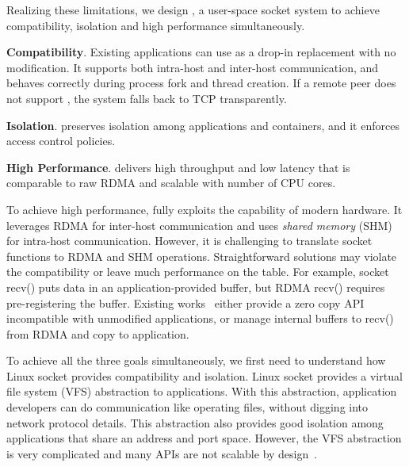 
Realizing these limitations, we design \sys{}, a user-space socket system to achieve compatibility, isolation and high performance simultaneously.
\begin{ecompact}
	\item \textbf{Compatibility}.
	Existing applications can use \sys{} as a drop-in replacement with no modification.
	It supports both intra-host and inter-host communication, and behaves correctly during process fork and thread creation.
	If a remote peer does not support \sys{}, the system falls back to TCP transparently.
	\item \textbf{Isolation}.
	\sys{} preserves isolation among applications and containers, and it enforces access control policies.
	\item \textbf{High Performance}.
	\sys{} delivers high throughput and low latency that is comparable to raw RDMA and scalable with number of CPU cores.
\end{ecompact}


To achieve high performance, \sys fully exploits the capability of modern hardware. It leverages RDMA for inter-host communication and uses \emph{shared memory} (SHM) for intra-host communication. However, it is challenging to translate socket functions to RDMA and SHM operations. Straightforward solutions may violate the compatibility or leave much performance on the table. For example, socket recv() puts data in an application-provided buffer, but RDMA recv() requires pre-registering the buffer. Existing works~\cite{rsockets} either provide a zero copy API incompatible with unmodified applications, or manage internal buffers to recv() from RDMA and copy to application. %

To achieve all the three goals simultaneously, we first need to understand how Linux socket provides compatibility and isolation. Linux socket provides a virtual file system (VFS) abstraction to applications. With this abstraction, application developers can do communication like operating files, without digging into network protocol details. This abstraction also provides good isolation among applications that share an address and port space. However, the VFS abstraction is very complicated and many APIs are not scalable by design~\cite{clark1989analysis,boyd2010analysis,jeong2014mtcp}.

